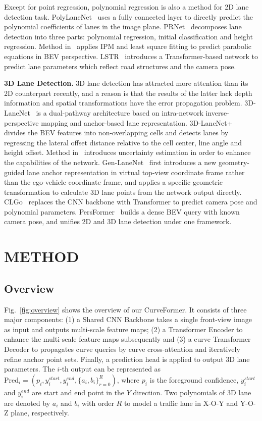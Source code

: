 \documentclass[letterpaper, 10 pt, conference]{ieeeconf}
\begin{document}
Except for point regression, polynomial regression is also a method for 2D lane detection task. PolyLaneNet~\cite{tabelini2020polylanenet} uses a fully connected layer to directly predict the polynomial coefficients of lanes in the image plane. PRNet~\cite{wang2020polynomial} decomposes lane detection into three parts: polynomial regression, initial classification and height regression. Method in~\cite{van2019end} applies IPM and least square fitting to predict parabolic equations in BEV perspective. LSTR~\cite{liu2021end} introduces a Transformer-based network to predict lane parameters which reflect road structures and the camera pose.

\noindent\textbf{3D Lane Detection.} 3D lane detection has attracted more attention than its 2D counterpart recently, and a reason is that the results of the latter lack depth information and spatial transformations have the error propagation problem. 3D-LaneNet~\cite{garnett20193d} is a dual-pathway architecture based on intra-network inverse-perspective mapping and anchor-based lane representation. 3D-LaneNet+~\cite{efrat20203d} divides the BEV features into non-overlapping cells and detects lanes by regressing the lateral offset distance relative to the cell center, line angle and height offset. Method in~\cite{efrat2020semi} introduces uncertainty estimation in order to enhance the capabilities of the network. Gen-LaneNet~\cite{guo2020gen} first introduces a new geometry-guided lane anchor representation in virtual top-view coordinate frame rather than the ego-vehicle coordinate frame, and applies a specific geometric transformation to calculate 3D lane points from the network output directly. CLGo~\cite{liu2022learning} replaces the CNN backbone with Transformer to predict camera pose and polynomial parameters. PersFormer~\cite{chen2022persformer} builds a dense BEV query with known camera pose, and unifies 2D and 3D lane detection under one framework.


\section{METHOD}


\subsection{Overview}
Fig.~\ref{fig:overview} shows the overview of our CurveFormer. It consists of three major components: (1) a Shared CNN Backbone takes a single front-view image as input and outputs multi-scale feature maps; (2) a Transformer Encoder to enhance the multi-scale feature maps subsequently and (3) a curve Transformer Decoder to propagates curve queries by curve cross-attention and iteratively refine anchor point sets. Finally, a prediction head is applied to output 3D lane parameters. The $i$-th output can be represented as $\text{Pred}_i = (p_i, y_i^{start}, y_i^{end}, \{a_i, b_i\}_{r=0}^R)$,
where $p_i$ is the foreground confidence, $y_i^{start}$ and $y_i^{end}$ are start and end point in the $Y$ direction. Two polynomials of 3D lane are denoted by $a_i$ and $b_i$ with order $R$ to model a traffic lane in X-O-Y and Y-O-Z plane, respectively.
\end{document}
